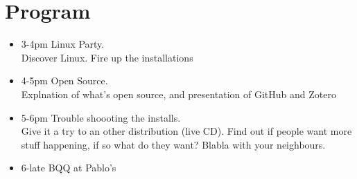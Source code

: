 \documentclass[a4paper]{article}
\begin{document}
\newpage
\section{Program}
\begin{itemize}
\item 3-4pm Linux Party.\\
Discover Linux. Fire up the installations
\item 4-5pm Open Source.\\
Explnation of what's open source, and presentation of GitHub and Zotero
\item 5-6pm Trouble shoooting the installs.\\
Give it a try to an other distribution (live CD). Find out if people want more stuff happening, if so what do they want? Blabla with your neighbours.
\item 6-late BQQ at Pablo's
\end{itemize}
\end{document}
